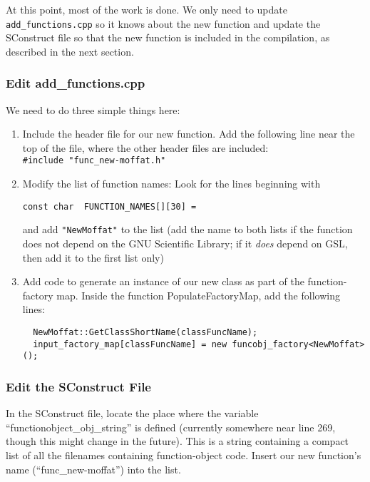 \documentclass[10pt]{article}
\begin{document}
At this point, most of the work is done.  We only need to update
\texttt{add\_functions.cpp} so it knows about the new function and
update the SConstruct file so that the new function is included in the
compilation, as described in the next section.


\subsubsection{Edit add\_functions.cpp}

We need to do three simple things here:
\begin{enumerate}
\item Include the header file for our new function. Add the following line near
the top of the file, where the other header files are included:\\
\texttt{\#include "func\_new-moffat.h"}

\item Modify the list of function names: Look for the lines beginning with
\begin{verbatim}
const char  FUNCTION_NAMES[][30] =
\end{verbatim}
and add \texttt{"NewMoffat"} to the list (add the name to both lists if the
function does not depend on the GNU Scientific Library; if it \textit{does} depend on GSL,
then add it to the first list only)

\item Add code to generate an instance of our new class as part of the
function-factory map. Inside the function PopulateFactoryMap, add the following lines:
\begin{verbatim}
  NewMoffat::GetClassShortName(classFuncName);
  input_factory_map[classFuncName] = new funcobj_factory<NewMoffat>();
\end{verbatim}

\end{enumerate}



\subsubsection{Edit the SConstruct File}

In the SConstruct file, locate the place where the variable
``functionobject\_obj\_string'' is defined (currently somewhere near line 269,
though this might change in the future). This is a string containing a
compact list of all the filenames containing function-object code. Insert our
new function's name (``func\_new-moffat'') into the list.
\end{document}
